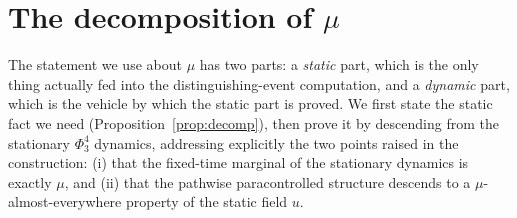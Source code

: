 \section*{The decomposition of $\mu$}

The statement we use about $\mu$ has two parts: a \emph{static} part, which is the
only thing actually fed into the distinguishing-event computation, and a
\emph{dynamic} part, which is the vehicle by which the static part is proved. We
first state the static fact we need (Proposition~\ref{prop:decomp}), then prove it
by descending from the stationary $\Phi^4_3$ dynamics, addressing explicitly the
two points raised in the construction: (i) that the fixed-time marginal of the
stationary dynamics is exactly $\mu$, and (ii) that the pathwise paracontrolled
structure descends to a $\mu$-almost-everywhere property of the static field $u$.

